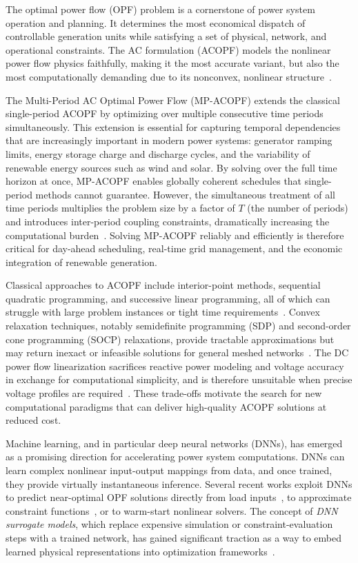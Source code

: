 \documentclass[journal]{IEEEtran}
\begin{document}
The optimal power flow (OPF) problem is a cornerstone of power system operation
and planning. It determines the most economical dispatch of controllable generation
units while satisfying a set of physical, network, and operational constraints. The
AC formulation (ACOPF) models the nonlinear power flow physics faithfully, making
it the most accurate variant, but also the most computationally demanding due to
its nonconvex, nonlinear structure~\cite{carpentier1962contribution,frank2012optimal}.

The Multi-Period AC Optimal Power Flow (MP-ACOPF) extends the classical single-period
ACOPF by optimizing over multiple consecutive time periods simultaneously. This
extension is essential for capturing temporal dependencies that are increasingly
important in modern power systems: generator ramping limits, energy storage charge
and discharge cycles, and the variability of renewable energy sources such as wind
and solar. By solving over the full time horizon at once, MP-ACOPF enables globally
coherent schedules that single-period methods cannot guarantee. However, the
simultaneous treatment of all time periods multiplies the problem size by a factor
of $T$ (the number of periods) and introduces inter-period coupling constraints,
dramatically increasing the computational burden~\cite{jabr2012adjustable}.
Solving MP-ACOPF reliably and efficiently is therefore critical for day-ahead
scheduling, real-time grid management, and the economic integration of
renewable generation.

Classical approaches to ACOPF include interior-point methods, sequential quadratic
programming, and successive linear programming, all of which can struggle with large
problem instances or tight time requirements~\cite{capitanescu2011interior}.
Convex relaxation techniques, notably semidefinite programming (SDP) and
second-order cone programming (SOCP) relaxations, provide tractable approximations
but may return inexact or infeasible solutions for general meshed
networks~\cite{lavaei2012zero}. The DC power flow linearization sacrifices reactive
power modeling and voltage accuracy in exchange for computational simplicity, and
is therefore unsuitable when precise voltage profiles are required~\cite{stott2009dc}.
These trade-offs motivate the search for new computational paradigms that can
deliver high-quality ACOPF solutions at reduced cost.

Machine learning, and in particular deep neural networks (DNNs), has emerged as
a promising direction for accelerating power system computations. DNNs can learn
complex nonlinear input-output mappings from data, and once trained, they provide
virtually instantaneous inference. Several recent works exploit DNNs to predict
near-optimal OPF solutions directly from load
inputs~\cite{zamzam2020learning,pan2023deepopf}, to approximate constraint
functions~\cite{venzke2020learning}, or to warm-start nonlinear solvers. The
concept of \emph{DNN surrogate models}, which replace expensive simulation or
constraint-evaluation steps with a trained network, has gained significant
traction as a way to embed learned physical representations into optimization
frameworks~\cite{chen2020learning,donti2021dc3}.
\end{document}
